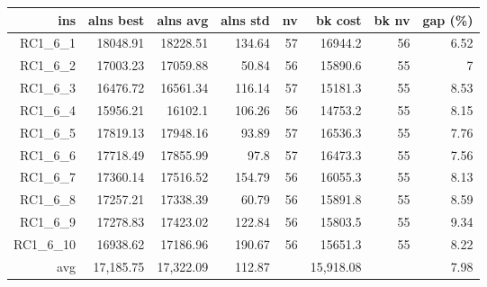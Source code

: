   \begin{table}[caption={Kết quả đo với tập HG\_RC\_1\_6 600 yêu cầu}, label=exp:HGRC16]
    \centering
    \begin{tabular}{rrrrrrrr}
    \hline
    ins & alns best & alns avg & alns std & nv & bk cost & bk nv & gap (\%) \\ \hline
    RC1\_6\_1 & 18048.91 & 18228.51 & 134.64 & 57 & 16944.2 & 56 & 6.52 \\ \hline
    RC1\_6\_2 & 17003.23 & 17059.88 & 50.84 & 56 & 15890.6 & 55 & 7 \\ \hline
    RC1\_6\_3 & 16476.72 & 16561.34 & 116.14 & 57 & 15181.3 & 55 & 8.53 \\ \hline
    RC1\_6\_4 & 15956.21 & 16102.1 & 106.26 & 56 & 14753.2 & 55 & 8.15 \\ \hline
    RC1\_6\_5 & 17819.13 & 17948.16 & 93.89 & 57 & 16536.3 & 55 & 7.76 \\ \hline
    RC1\_6\_6 & 17718.49 & 17855.99 & 97.8 & 57 & 16473.3 & 55 & 7.56 \\ \hline
    RC1\_6\_7 & 17360.14 & 17516.52 & 154.79 & 56 & 16055.3 & 55 & 8.13 \\ \hline
    RC1\_6\_8 & 17257.21 & 17338.39 & 60.79 & 56 & 15891.8 & 55 & 8.59 \\ \hline
    RC1\_6\_9 & 17278.83 & 17423.02 & 122.84 & 56 & 15803.5 & 55 & 9.34 \\ \hline
    RC1\_6\_10 & 16938.62 & 17186.96 & 190.67 & 56 & 15651.3 & 55 & 8.22 \\ \hline
    avg & 17,185.75 & 17,322.09 & 112.87 & & 15,918.08 & & 7.98 \\ \hline
    \end{tabular}
  \end{table}

